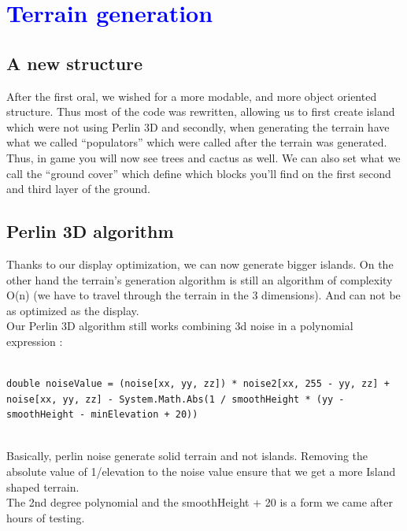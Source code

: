 \documentclass[article]{report}             %
\begin{document}
		\chapter{\textcolor{blue}{Terrain generation}}
			\section{A new structure}
				After the first oral, we wished for a more modable, and more object oriented structure. Thus most of the code was rewritten, allowing us to first create island which were not using Perlin 3D and secondly, when generating the terrain have what we called \enquote{populators} which were called after the terrain was generated.\\

				Thus, in game you will now see trees and cactus as well. We can also set what we call the \enquote{ground cover} which define which blocks you'll find on the first second and third layer of the ground. 
				
			\section{Perlin 3D algorithm}
				Thanks to our display optimization, we can now generate bigger islands. On the other hand the terrain's generation algorithm is still an algorithm of complexity O(n) (we have to travel through the terrain in the 3 dimensions). And can not be as optimized as the display.\\



				Our Perlin 3D algorithm still works combining 3d noise in a polynomial expression :

				\begin{lstlisting}

double noiseValue = (noise[xx, yy, zz]) * noise2[xx, 255 - yy, zz] + noise[xx, yy, zz] - System.Math.Abs(1 / smoothHeight * (yy - smoothHeight - minElevation + 20))

				\end{lstlisting} 
~\\

				Basically, perlin noise generate solid terrain and not islands. Removing the absolute value of 1/elevation to the noise value ensure that we get a more Island shaped terrain.\\
				The 2nd degree polynomial and the smoothHeight + 20 is a form we came after hours of testing. \\
\end{document}
